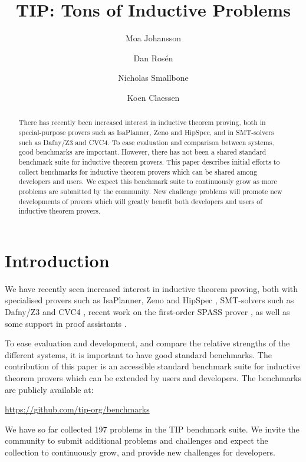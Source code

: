 \documentclass{llncs}
\begin{document}
\title{TIP: Tons of Inductive Problems}

\author{Moa Johansson \and Dan Ros\'en \and Nicholas Smallbone \and Koen Claessen}

\titlerunning{}

\maketitle

\begin{abstract}
There has recently been increased interest in inductive theorem
proving, both in special-purpose provers such as
IsaPlanner, Zeno and HipSpec, and in SMT-solvers such as
Dafny/Z3 and CVC4. To ease evaluation and comparison between systems,
good benchmarks are important. However, there has not been a shared
standard benchmark suite for inductive theorem provers. This paper
describes initial efforts to collect benchmarks for inductive theorem
provers which can be shared among developers and users.
We expect this benchmark suite to continuously grow as
more problems are submitted by the community. New challenge problems
will promote new developments of provers which will greatly benefit
both developers and users of inductive theorem provers.

\end{abstract}

\section{Introduction}

We have recently seen increased interest in inductive theorem proving, both with specialised provers such as IsaPlanner, Zeno and HipSpec \cite{dixon2007isaplanner,zeno,hipspecCADE}, SMT-solvers such as Dafny/Z3 and CVC4 \cite{dafny,cvc4}, recent work on the first-order SPASS prover \cite{SPASSInduction}, as well as some support in proof assistants \cite{acl2,hipster}.

To ease evaluation and development, and compare the relative strengths of the different systems, it is important to have good standard benchmarks. The contribution of this paper is an accessible standard benchmark suite for inductive theorem provers which can be extended by users and developers. The benchmarks are publicly available at:
\begin{center}
\url{https://github.com/tip-org/benchmarks}
\end{center}
We have so far collected 197 problems in the TIP benchmark suite. We invite the community to submit additional problems and challenges and expect the collection to continuously grow, and provide new challenges for developers.
\end{document}
